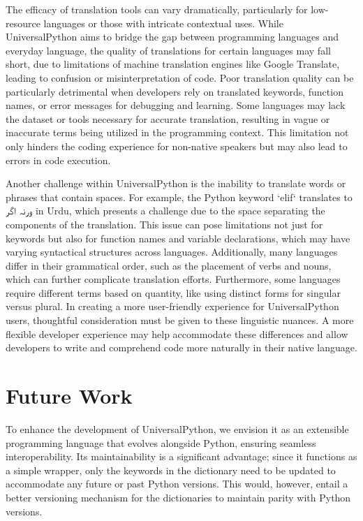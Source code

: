 \documentclass[conference]{IEEEtran}
\begin{document}
The efficacy of translation tools can vary dramatically, particularly for low-resource languages or those with intricate contextual uses. While UniversalPython aims to bridge the gap between programming languages and everyday language, the quality of translations for certain languages may fall short, due to limitations of machine translation engines like Google Translate, leading to confusion or misinterpretation of code. Poor translation quality can be particularly detrimental when developers rely on translated keywords, function names, or error messages for debugging and learning. Some languages may lack the dataset or tools necessary for accurate translation, resulting in vague or inaccurate terms being utilized in the programming context. This limitation not only hinders the coding experience for non-native speakers but may also lead to errors in code execution.

Another challenge within UniversalPython is the inability to translate words or phrases that contain spaces. For example, the Python keyword `elif` translates to \texturdu{ورنہ اگر} in Urdu, which presents a challenge due to the space separating the components of the translation. This issue can pose limitations not just for keywords but also for function names and variable declarations, which may have varying syntactical structures across languages. Additionally, many languages differ in their grammatical order, such as the placement of verbs and nouns, which can further complicate translation efforts. Furthermore, some languages require different terms based on quantity, like using distinct forms for singular versus plural. In creating a more user-friendly experience for UniversalPython users, thoughtful consideration must be given to these linguistic nuances. A more flexible developer experience may help accommodate these differences and allow developers to write and comprehend code more naturally in their native language.

\section{Future Work}

To enhance the development of UniversalPython, we envision it as an extensible programming language that evolves alongside Python, ensuring seamless interoperability. Its maintainability is a significant advantage; since it functions as a simple wrapper, only the keywords in the dictionary need to be updated to accommodate any future or past Python versions. This would, however, entail a better versioning mechanism for the dictionaries to maintain parity with Python versions.
\end{document}
